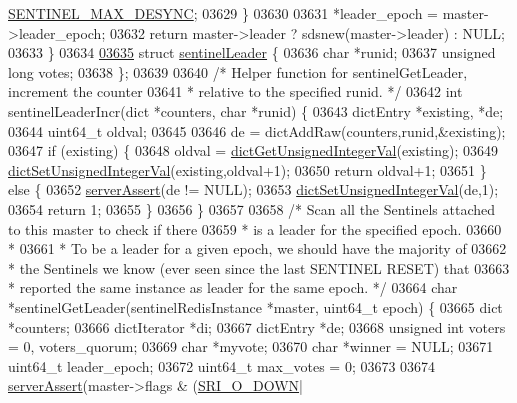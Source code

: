 \begin{DoxyCode}
{{{{{{{{{{{{{{{{{{{{{{{{{{{{{{{{{{{{{{{{{{{{{{{{{{{{{{{{{{{{{{{{{{{{{{{{{{{{{{{{{{      \hyperlink{sentinel_8c_aab501d7852d456a92670860045725d5b}{SENTINEL\_MAX\_DESYNC};
03629     \}
03630 
03631     *leader\_epoch = master->leader\_epoch;
03632     \textcolor{keywordflow}{return} master->leader ? sdsnew(master->leader) : NULL;
03633 \}
03634 
\hyperlink{structsentinelLeader}{03635} \textcolor{keyword}{struct} \hyperlink{structsentinelLeader}{sentinelLeader} \{
03636     \textcolor{keywordtype}{char} *runid;
03637     \textcolor{keywordtype}{unsigned} \textcolor{keywordtype}{long} votes;
03638 \};
03639 
03640 \textcolor{comment}{/* Helper function for sentinelGetLeader, increment the counter}
03641 \textcolor{comment}{ * relative to the specified runid. */}
03642 \textcolor{keywordtype}{int} sentinelLeaderIncr(dict *counters, \textcolor{keywordtype}{char} *runid) \{
03643     dictEntry *existing, *de;
03644     uint64\_t oldval;
03645 
03646     de = dictAddRaw(counters,runid,&existing);
03647     \textcolor{keywordflow}{if} (existing) \{
03648         oldval = \hyperlink{dict_8h_ad65abe818fa141e537800699668a7f09}{dictGetUnsignedIntegerVal}(existing);
03649         \hyperlink{dict_8h_aa846a3c28ad69004259435fd44246e10}{dictSetUnsignedIntegerVal}(existing,oldval+1);
03650         \textcolor{keywordflow}{return} oldval+1;
03651     \} \textcolor{keywordflow}{else} \{
03652         \hyperlink{server_8h_a88114b5169b4c382df6b56506285e56a}{serverAssert}(de != NULL);
03653         \hyperlink{dict_8h_aa846a3c28ad69004259435fd44246e10}{dictSetUnsignedIntegerVal}(de,1);
03654         \textcolor{keywordflow}{return} 1;
03655     \}
03656 \}
03657 
03658 \textcolor{comment}{/* Scan all the Sentinels attached to this master to check if there}
03659 \textcolor{comment}{ * is a leader for the specified epoch.}
03660 \textcolor{comment}{ *}
03661 \textcolor{comment}{ * To be a leader for a given epoch, we should have the majority of}
03662 \textcolor{comment}{ * the Sentinels we know (ever seen since the last SENTINEL RESET) that}
03663 \textcolor{comment}{ * reported the same instance as leader for the same epoch. */}
03664 \textcolor{keywordtype}{char} *sentinelGetLeader(sentinelRedisInstance *master, uint64\_t epoch) \{
03665     dict *counters;
03666     dictIterator *di;
03667     dictEntry *de;
03668     \textcolor{keywordtype}{unsigned} \textcolor{keywordtype}{int} voters = 0, voters\_quorum;
03669     \textcolor{keywordtype}{char} *myvote;
03670     \textcolor{keywordtype}{char} *winner = NULL;
03671     uint64\_t leader\_epoch;
03672     uint64\_t max\_votes = 0;
03673 
03674     \hyperlink{server_8h_a88114b5169b4c382df6b56506285e56a}{serverAssert}(master->flags & (\hyperlink{sentinel_8c_a3bbbca05543cd9d9f86d276e2c7c719c}{SRI\_O\_DOWN}|
}}}}}}}}}}}}}}}}}}}}}}}}}}}}}}}}}}}}}}}}}}}}}}}}}}}}}}}}}}}}}}}}}}}}}}}}}}}}}}}}}}
\end{DoxyCode}
